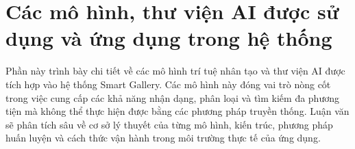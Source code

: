 \section{Các mô hình, thư viện AI được sử dụng và ứng dụng trong hệ thống}

Phần này trình bày chi tiết về các mô hình trí tuệ nhân tạo và thư viện AI được tích hợp vào hệ thống Smart Gallery. Các mô hình này đóng vai trò nòng cốt trong việc cung cấp các khả năng nhận dạng, phân loại và tìm kiếm đa phương tiện mà không thể thực hiện được bằng các phương pháp truyền thống. Luận văn sẽ phân tích sâu về cơ sở lý thuyết của từng mô hình, kiến trúc, phương pháp huấn luyện và cách thức vận hành trong môi trường thực tế của ứng dụng.


